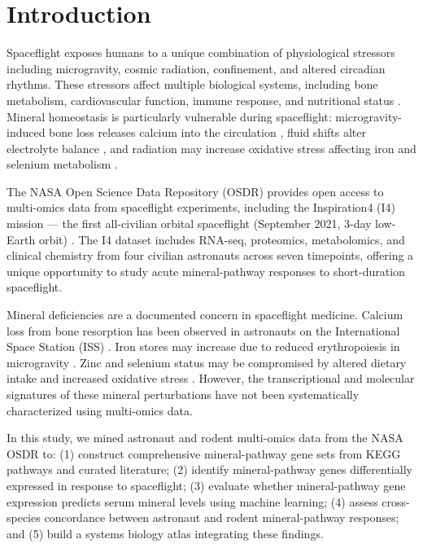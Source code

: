 \documentclass[11pt,a4paper]{article}
\begin{document}
\section{Introduction}

Spaceflight exposes humans to a unique combination of physiological stressors including microgravity, cosmic radiation, confinement, and altered circadian rhythms. These stressors affect multiple biological systems, including bone metabolism, cardiovascular function, immune response, and nutritional status \citep{williams2009}. Mineral homeostasis is particularly vulnerable during spaceflight: microgravity-induced bone loss releases calcium into the circulation \citep{smith2005}, fluid shifts alter electrolyte balance \citep{norsk2015}, and radiation may increase oxidative stress affecting iron and selenium metabolism \citep{stein2000}.

The NASA Open Science Data Repository (OSDR) provides open access to multi-omics data from spaceflight experiments, including the Inspiration4 (I4) mission --- the first all-civilian orbital spaceflight (September 2021, 3-day low-Earth orbit) \citep{overbey2024}. The I4 dataset includes RNA-seq, proteomics, metabolomics, and clinical chemistry from four civilian astronauts across seven timepoints, offering a unique opportunity to study acute mineral-pathway responses to short-duration spaceflight.

Mineral deficiencies are a documented concern in spaceflight medicine. Calcium loss from bone resorption has been observed in astronauts on the International Space Station (ISS) \citep{smith2014}. Iron stores may increase due to reduced erythropoiesis in microgravity \citep{smith2005iron}. Zinc and selenium status may be compromised by altered dietary intake and increased oxidative stress \citep{stein2000}. However, the transcriptional and molecular signatures of these mineral perturbations have not been systematically characterized using multi-omics data.

In this study, we mined astronaut and rodent multi-omics data from the NASA OSDR to: (1) construct comprehensive mineral-pathway gene sets from KEGG pathways and curated literature; (2) identify mineral-pathway genes differentially expressed in response to spaceflight; (3) evaluate whether mineral-pathway gene expression predicts serum mineral levels using machine learning; (4) assess cross-species concordance between astronaut and rodent mineral-pathway responses; and (5) build a systems biology atlas integrating these findings.
\end{document}
